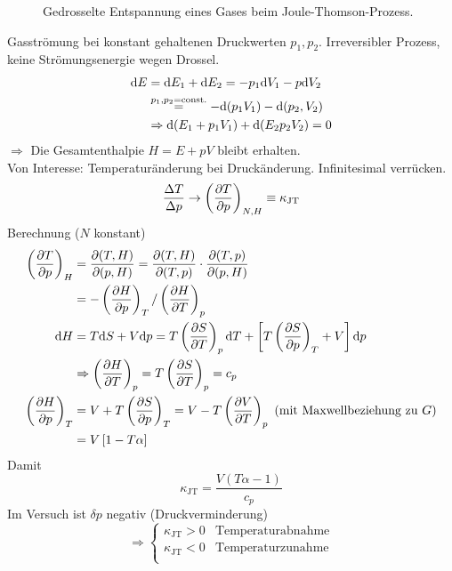 \begin{figure}[H]
        \centering
        \def\svgwidth{0.6\textwidth}
        
        \caption{Gedrosselte Entspannung eines Gases beim Joule-Thomson-Prozess.}
        \label{img:joule-thomson-process}
\end{figure}


Gasströmung bei konstant gehaltenen Druckwerten $p_1, p_2$. Irreversibler Prozess, keine Strömungsenergie wegen Drossel.
\begin{equation}
    \begin{split}
        \mathrm{d} E &= \mathrm{d} E_1 + \mathrm{d} E_2 = - p_1 \mathrm{d} V_1 - p \mathrm{d} V_2 \\
        & \overset{p_1, p_2 = \text{const.}}{=} - \mathrm{d} (p_1 V_1) - \mathrm{d} (p_2, V_2) \\
        & \Rightarrow \mathrm{d} (E_1 + p_1 V_1) + \mathrm{d} (E_2 p_2 V_2) = 0
    \end{split}
\end{equation}
$\Rightarrow$ Die Gesamtenthalpie $H = E + p V$ bleibt erhalten.\\
Von Interesse: Temperaturänderung bei Druckänderung. Infinitesimal verrücken.
\begin{equation}
    \frac{\Delta T}{\Delta p} \to \left( \frac{\partial T}{\partial p} \right)_{N, H} \equiv \kappa_\text{JT}
\end{equation}
Berechnung ($N$ konstant)
\begin{equation}
    \begin{split}
        \left( \frac{\partial T}{\partial p} \right)_{H} &= \frac{\partial (T, H)}{\partial (p, H)} = \frac{\partial (T, H)}{\partial (T, p)} \cdot \frac{\partial (T, p)}{\partial (p, H)} \\
        &= - \left( \frac{\partial H}{\partial p} \right)_{T} / \left( \frac{\partial H}{\partial T} \right)_{p} \\
        \mathrm{d} H &= T \mathrm{d} S + V \mathrm{d} p = T \left( \frac{\partial S}{\partial T} \right)_{p} \mathrm{d} T + \left[ T \left( \frac{\partial S}{\partial p} \right)_{T} + V \right] \mathrm{d} p \\
        & \Rightarrow \left( \frac{\partial H}{\partial T} \right)_{p} = T \left( \frac{\partial S}{\partial T} \right)_{p} = c_p \\
        \left( \frac{\partial H}{\partial p} \right)_{T} &= V + T \left( \frac{\partial S}{\partial p} \right)_{T} = V - T \left( \frac{\partial V}{\partial T} \right)_{p} \text{ (mit Maxwellbeziehung zu $G$)} \\
        &= V \left[ 1 - T \alpha \right]
    \end{split}
\end{equation}
Damit
\begin{equation}
    \kappa_\text{JT} = \frac{V \left( T \alpha - 1 \right) }{c_p}
\end{equation}
Im Versuch ist $\delta p$ negativ (Druckverminderung)
\begin{equation}
    \Rightarrow
    \begin{cases}
        \kappa_\text{JT} > 0 & \text{Temperaturabnahme} \\
        \kappa_\text{JT} < 0 & \text{Temperaturzunahme} \\
    \end{cases}
\end{equation}
